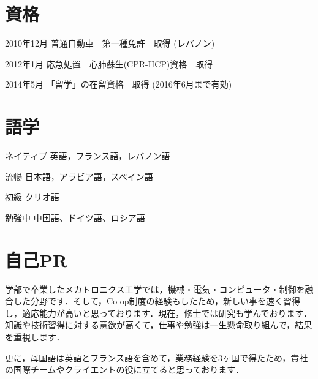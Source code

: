 \documentclass[10pt, a4paper]{article}
\begin{document}
\section{資格}
\begin{outerlist}
\item[2010年12月] 普通自動車　第一種免許　取得 (レバノン)
\item[2012年1月] 応急処置　心肺蘇生(CPR-HCP)資格　取得
\item[2014年5月] 「留学」の在留資格　取得 (2016年6月まで有効)
\end{outerlist}

\section{語学}
\begin{outerlist}
\item[ネイティブ] 英語，フランス語，レバノン語
\item[流暢] 日本語，アラビア語，スペイン語
\item[初級] クリオ語
\item[勉強中] 中国語、ドイツ語、ロシア語
\end{outerlist}

\section{自己PR}
\begin{outerlist}
\item[] 学部で卒業したメカトロニクス工学では，機械・電気・コンピュータ・制御を融合した分野です．そして，Co-op制度の経験もしたため，新しい事を速く習得し，適応能力が高いと思っております．現在，修士では研究も学んでおります．知識や技術習得に対する意欲が高くて，仕事や勉強は一生懸命取り組んで，結果を重視します．

\item[] 更に，母国語は英語とフランス語を含めて，業務経験を3ヶ国で得たため，貴社の国際チームやクライエントの役に立てると思っております．

\end{outerlist}
\end{document}
